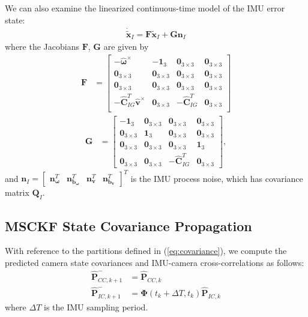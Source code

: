 \documentclass[letterpaper, 10 pt, conference]{ieeeconf}  %
\def\Vec#1{\mathbf{#1}}
\newcommand{\bbm}{\begin{bmatrix}}
\newcommand{\ebm}{\end{bmatrix}}
\begin{document}
We can also examine the linearized continuous-time model of the IMU error state:
\begin{align}
    \dot{\widetilde{\Vec{x}}}_I = \Vec{F}\widetilde{\Vec{x}}_I + \Vec{G}\Vec{n}_I
\end{align}
where the Jacobians $\Vec{F}$, $\Vec{G}$ are given by
\begin{align}
\Vec{F} &= \bbm -\hat{\boldsymbol{\omega}}^\times & -\Vec{1}_3 & \Vec{0}_{3\times3} & \Vec{0}_{3\times3} \\
                    \Vec{0}_{3\times3} & \Vec{0}_{3\times3} & \Vec{0}_{3\times3} & \Vec{0}_{3\times3} \\
                    \Vec{0}_{3\times3} & \Vec{0}_{3\times3} & \Vec{0}_{3\times3} & \Vec{0}_{3\times3} \\
                    -\hat{\Vec{C}}_{I G}^T \hat{\Vec{v}}^\times & \Vec{0}_{3\times3} & -\hat{\Vec{C}}_{I G}^T & \Vec{0}_{3\times3} \\
            \ebm
\end{align}
\begin{align}
\Vec{G} &=  \bbm    -\Vec{1}_3 & \Vec{0}_{3\times3} & \Vec{0}_{3\times3} & \Vec{0}_{3\times3} \\
                                \Vec{0}_{3\times3} & \Vec{1}_3 & \Vec{0}_{3\times3} & \Vec{0}_{3\times3} \\
                                \Vec{0}_{3\times3} & \Vec{0}_{3\times3} & \Vec{0}_{3\times3} & \Vec{1}_3 \\
                                \Vec{0}_{3\times3} & \Vec{0}_{3\times3} & -\hat{\Vec{C}}_{I G}^T & \Vec{0}_{3\times3}
            \ebm ,
\end{align}
and $\Vec{n}_I = \bbm \Vec{n}_{\boldsymbol{\omega}}^T & \Vec{n}_{\Vec{b}_{\boldsymbol{\omega}}}^T & \Vec{n}_{\Vec{v}}^T & \Vec{n}_{\Vec{b}_{\Vec{v}}}^T \ebm^T$ is the IMU process noise, which has covariance matrix $\Vec{Q}_I$.

\subsection{MSCKF State Covariance Propagation}
With reference to the partitions defined in (\ref{eq:covariance}), we compute the predicted camera state covariances and IMU-camera cross-correlations as follows:
\begin{align}
    \hat{\Vec{P}}^-_{CC,k+1} &= \hat{\Vec{P}}_{CC,k} \\
    \hat{\Vec{P}}^-_{IC,k+1} &= \boldsymbol{\Phi}\left(t_k + \Delta T, t_k \right) \hat{\Vec{P}}_{IC,k}
\end{align}
where $\Delta T$ is the IMU sampling period.
\end{document}
